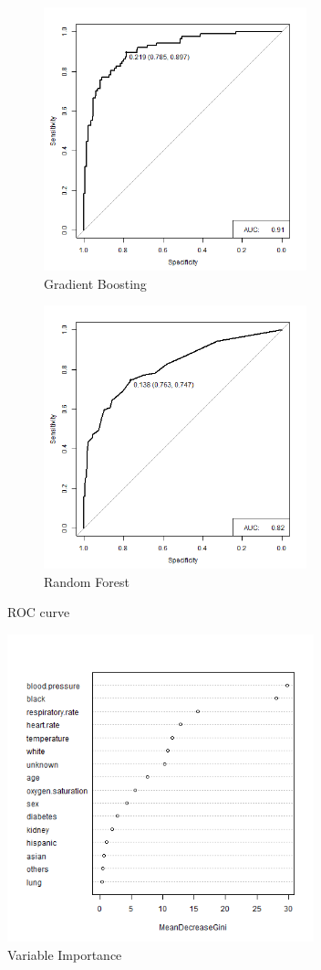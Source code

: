 \documentclass[twoside,11pt]{article}
\begin{document}
\begin{figure}[htbp]
	\begin{subfigure}{.5\textwidth}
		\centering 
		\includegraphics[width=3in]{gbm_shock_auc.png} 
		\caption{Gradient Boosting}
		\label{fig:gbm_shock} 
	\end{subfigure}%
	\begin{subfigure}{.5\textwidth}
		\centering 
		\includegraphics[width=3in]{rf_shock_auc.png} 
		\caption{Random Forest}
		\label{fig:rf_shock} 
	\end{subfigure}
	\caption{ROC curve}
	\label{fig:fig}
\end{figure}  

\begin{figure}[htbp]
	\centering
	\includegraphics[width=3.5in]{rf_var_shock.png} 
	\caption{Variable Importance}
	\label{fig:var}
\end{figure} 
\end{document}
